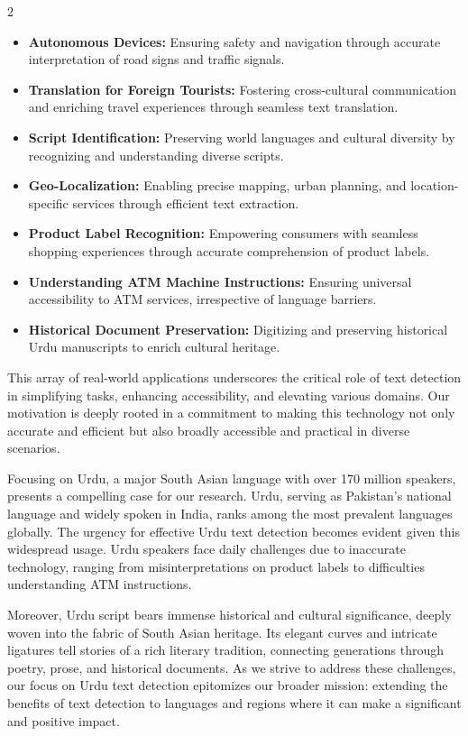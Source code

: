 \documentclass[sn-mathphys,Numbered]{sn-jnl}%
\begin{document}
\begin{multicols}{2}
\begin{itemize}
	\item \textbf{Autonomous Devices:} Ensuring safety and navigation through accurate interpretation of road signs and traffic signals.
	\item \textbf{Translation for Foreign Tourists:} Fostering cross-cultural communication and enriching travel experiences through seamless text translation.
	\item \textbf{Script Identification:} Preserving world languages and cultural diversity by recognizing and understanding diverse scripts.
	\item \textbf{Geo-Localization:} Enabling precise mapping, urban planning, and location-specific services through efficient text extraction.
	\item \textbf{Product Label Recognition:} Empowering consumers with seamless shopping experiences through accurate comprehension of product labels.
	\item \textbf{Understanding ATM Machine Instructions:} Ensuring universal accessibility to ATM services, irrespective of language barriers.
	\item \textbf{Historical Document Preservation:} Digitizing and preserving historical Urdu manuscripts to enrich cultural heritage.
\end{itemize}

This array of real-world applications underscores the critical role of text detection in simplifying tasks, enhancing accessibility, and elevating various domains. Our motivation is deeply rooted in a commitment to making this technology not only accurate and efficient but also broadly accessible and practical in diverse scenarios.

Focusing on Urdu, a major South Asian language with over 170 million speakers, presents a compelling case for our research. Urdu, serving as Pakistan's national language and widely spoken in India, ranks among the most prevalent languages globally. The urgency for effective Urdu text detection becomes evident given this widespread usage. Urdu speakers face daily challenges due to inaccurate technology, ranging from misinterpretations on product labels to difficulties understanding ATM instructions.

Moreover, Urdu script bears immense historical and cultural significance, deeply woven into the fabric of South Asian heritage. Its elegant curves and intricate ligatures tell stories of a rich literary tradition, connecting generations through poetry, prose, and historical documents. As we strive to address these challenges, our focus on Urdu text detection epitomizes our broader mission: extending the benefits of text detection to languages and regions where it can make a significant and positive impact.


\end{multicols}
\end{document}
